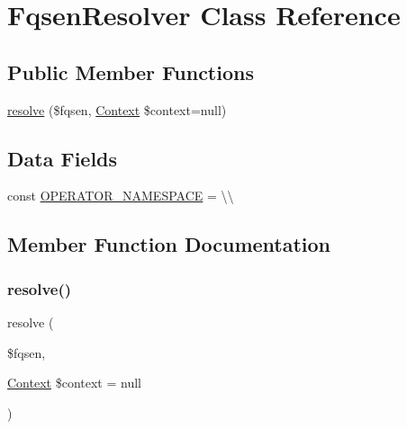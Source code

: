 \hypertarget{classphp_documentor_1_1_reflection_1_1_fqsen_resolver}{}\section{Fqsen\+Resolver Class Reference}
\label{classphp_documentor_1_1_reflection_1_1_fqsen_resolver}
\subsection*{Public Member Functions}
\begin{DoxyCompactItemize}
\item 
\mbox{\hyperlink{classphp_documentor_1_1_reflection_1_1_fqsen_resolver_a3196d9572de828431cef05689d3f6395}{resolve}} (\$fqsen, \mbox{\hyperlink{classphp_documentor_1_1_reflection_1_1_types_1_1_context}{Context}} \$context=null)
\end{DoxyCompactItemize}
\subsection*{Data Fields}
\begin{DoxyCompactItemize}
\item 
const \mbox{\hyperlink{classphp_documentor_1_1_reflection_1_1_fqsen_resolver_a19edcdc9d5b7dc49985e779614b90973}{O\+P\+E\+R\+A\+T\+O\+R\+\_\+\+N\+A\+M\+E\+S\+P\+A\+CE}} = \textquotesingle{}\textbackslash{}\textbackslash{}\textquotesingle{}
\end{DoxyCompactItemize}


\subsection{Member Function Documentation}
\mbox{\label{classphp_documentor_1_1_reflection_1_1_fqsen_resolver_a3196d9572de828431cef05689d3f6395}} 
\subsubsection{\texorpdfstring{resolve()}{resolve()}}
{\footnotesize\ttfamily resolve (\begin{DoxyParamCaption}\item[{}]{\$fqsen,  }\item[{\mbox{\hyperlink{classphp_documentor_1_1_reflection_1_1_types_1_1_context}{Context}}}]{\$context = {\ttfamily null} }\end{DoxyParamCaption})}



